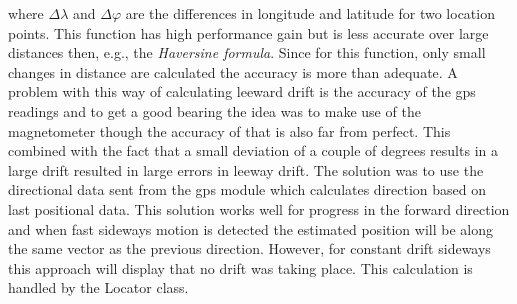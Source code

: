 where $\Delta\lambda$ and $\Delta\varphi$ are the differences in longitude and latitude for two location points. This function has high performance gain but is less accurate over large distances then, e.g., the \textit{Haversine formula}\cite{haversine}. Since for this function, only small changes in distance are calculated the accuracy is more than adequate. A problem with this way of calculating leeward drift is the accuracy of the \gls{gps} readings and to get a good bearing the idea was to make use of the magnetometer though the accuracy of that is also far from perfect. This combined with the fact that a small deviation of a couple of degrees results in a large drift resulted in large errors in leeway drift. The solution was to use the directional data sent from the \gls{gps} module which calculates direction based on last positional data. This solution works well for progress in the forward direction and when fast sideways motion is detected the estimated position will be along the same vector as the previous direction. However, for constant drift sideways this approach will display that no drift was taking place. This calculation is handled by the Locator class.


























